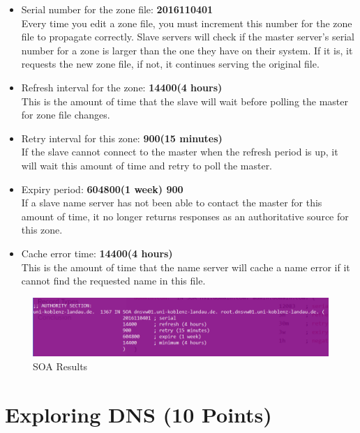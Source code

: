 \documentclass{WeSTassignment}
\begin{document}
\begin{enumerate}
\begin{itemize}
\item Serial number for the zone file: \textbf{2016110401} \\Every time you edit a zone file, you must increment this number for the zone file to propagate correctly. Slave servers will check if the master server's serial number for a zone is larger than the one they have on their system. If it is, it requests the new zone file, if not, it continues serving the original file.

\item Refresh interval for the zone: \textbf{ 14400(4 hours)}\\ This is the amount of time that the slave will wait before polling the master for zone file changes.

\item Retry interval for this zone: \textbf{900(15 minutes)}\\ If the slave cannot connect to the master when the refresh period is up, it will wait this amount of time and retry to poll the master.
\item Expiry period: \textbf{604800(1 week) 900}\\ If a slave name server has not been able to contact the master for this amount of time, it no longer returns responses as an authoritative source for this zone.

\item Cache error time: \textbf{14400(4 hours)}\\This is the amount of time that the name server will cache a name error if it cannot find the requested name in this file.
\end{itemize}

\begin{figure}[!hb]
\centering
\includegraphics[scale=0.7]{soa.png}
\caption{SOA Results}
	\label{fig:soa}
\end{figure}

\end{enumerate}


\section{Exploring DNS (10 Points)}
\end{document}

